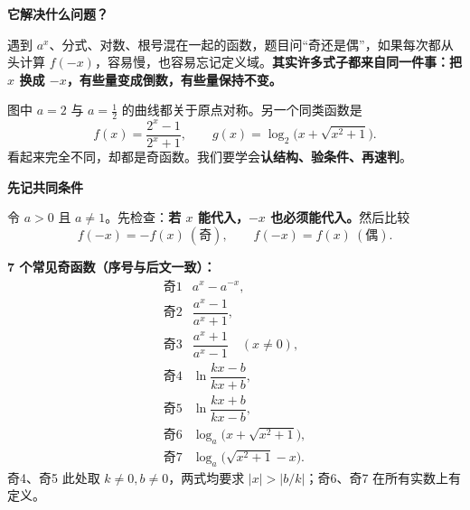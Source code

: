 \begin{statementbox}


\textbf{\textcolor{CStatement}{它解决什么问题？}}

遇到 $a^x$、分式、对数、根号混在一起的函数，题目问“奇还是偶”，如果每次都从头计算 $f(-x)$，容易慢，也容易忘记定义域。\textbf{其实许多式子都来自同一件事：把 $x$ 换成 $-x$，有些量变成倒数，有些量保持不变。}

图中 $a=2$ 与 $a=\frac12$ 的曲线都关于原点对称。另一个同类函数是
\[
 f(x)=\frac{2^x-1}{2^x+1},\qquad
 g(x)=\log_2\!\bigl(x+\sqrt{x^2+1}\bigr).
\]
看起来完全不同，却都是奇函数。我们要学会\textbf{认结构、验条件、再速判}。
\medskip
\end{statementbox}
\clearpage
\begin{statementbox}
\textbf{\textcolor{CStatement}{先记共同条件}}

令 $a>0$ 且 $a\ne1$。先检查：\textbf{若 $x$ 能代入，$-x$ 也必须能代入。}然后比较
\[
 \boxed{f(-x)=-f(x)\ (\text{奇})},\qquad
 \boxed{f(-x)=f(x)\ (\text{偶})}.
\]

\textbf{7 个常见奇函数（序号与后文一致）：}
\[
\begin{array}{rl}
\text{奇1}&a^x-a^{-x},\\[3pt]
\text{奇2}&\dfrac{a^x-1}{a^x+1},\\[6pt]
\text{奇3}&\dfrac{a^x+1}{a^x-1}\quad(x\ne0),\\[6pt]
\text{奇4}&\ln\dfrac{kx-b}{kx+b},\\[6pt]
\text{奇5}&\ln\dfrac{kx+b}{kx-b},\\[6pt]
\text{奇6}&\log_a\!\bigl(x+\sqrt{x^2+1}\bigr),\\[3pt]
\text{奇7}&\log_a\!\bigl(\sqrt{x^2+1}-x\bigr).
\end{array}
\]
奇4、奇5 此处取 $k\ne0,b\ne0$，两式均要求 $|x|>|b/k|$；奇6、奇7 在所有实数上有定义。
\end{statementbox}
\clearpage
